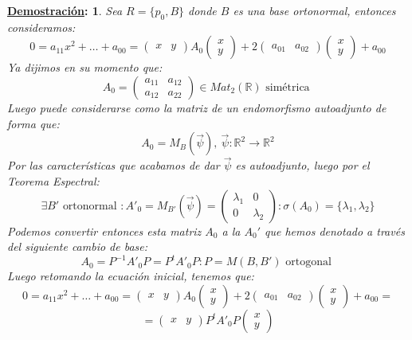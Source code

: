 \documentclass[10pt,a4paper,openright]{book}
\theoremstyle{break}
\newtheorem*{demo}{\underline{Demostración}:}
\begin{document}
\begin{demo}
Sea $R = \{p_0, B\}$ donde $B$ es una base ortonormal, entonces consideramos:
$$0 = a_{11}x^2 + \ldots + a_{00} = \begin{pmatrix} x & y \end{pmatrix} A_0 \begin{pmatrix} x \\ y \end{pmatrix} + 2 \begin{pmatrix} a_{01} & a_{02} \end{pmatrix} \begin{pmatrix} x \\ y \end{pmatrix} + a_{00}$$
Ya dijimos en su momento que:
$$A_0 = \begin{pmatrix}
a_{11} & a_{12} \\ a_{12} & a_{22}
\end{pmatrix} \in Mat_2 (\mathbb{R}) \mbox{ simétrica }$$
Luego puede considerarse como la matriz de un endomorfismo autoadjunto de forma que:
$$A_0 = M_B (\vec{\psi}), \ \vec{\psi} : \mathbb{R}^2 \to \mathbb{R}^2$$
Por las características que acabamos de dar $\vec{\psi}$ es autoadjunto, luego por el Teorema Espectral:
$$\exists B' \mbox{ ortonormal }: A'_0 = M_{B'} (\vec{\psi}) = \begin{pmatrix} \lambda_1 & 0 \\ 0 & \lambda_2 \end{pmatrix}:  \sigma(A_0) = \{\lambda_1, \lambda_2\}$$
Podemos convertir entonces esta matriz $A_0$ a la $A_0'$ que hemos denotado a través del siguiente cambio de base:
$$A_0 = P^{-1} A'_0 P = P^t A'_0 P : P = M(B, B') \mbox{ ortogonal }$$
Luego retomando la ecuación inicial, tenemos que:
$$0 = a_{11}x^2 + \ldots + a_{00} = \begin{pmatrix} x & y \end{pmatrix} A_0 \begin{pmatrix} x \\ y \end{pmatrix} + 2 \begin{pmatrix} a_{01} & a_{02} \end{pmatrix} \begin{pmatrix} x \\ y \end{pmatrix} + a_{00} =$$
$$= \begin{pmatrix}
x & y
\end{pmatrix} P^t A'_0 P \begin{pmatrix}
x \\ y

\end{pmatrix}$$
\end{demo}
\end{document}
